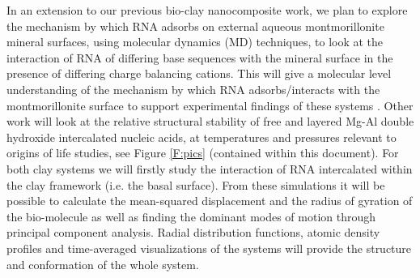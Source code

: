 \begin{compactenum}[a)]
In an extension to our previous bio-clay nanocomposite work, we plan to explore the mechanism by which RNA adsorbs on external aqueous montmorillonite mineral surfaces, using molecular dynamics (MD) techniques, to look at the interaction of RNA of differing base sequences with the mineral surface in the presence of differing charge balancing cations. This will give a molecular level understanding of the mechanism by which RNA adsorbs/interacts with the montmorillonite surface to support experimental findings of these systems \cite{Franchi, Huang}. Other work will look at the relative structural stability of free and layered Mg-Al double hydroxide intercalated nucleic acids, at temperatures and pressures relevant to origins of life studies, see Figure \ref{F:pics} (contained within this document). For both clay systems we will firstly study the interaction of RNA intercalated within the clay framework (i.e. the basal surface).  From these simulations it will be possible to calculate the mean-squared displacement and the radius of gyration of the bio-molecule as well as finding the dominant modes of motion through principal component analysis. Radial distribution functions, atomic density profiles and time-averaged visualizations of the systems will provide the structure and conformation of the whole system.
 

\end{compactenum}
